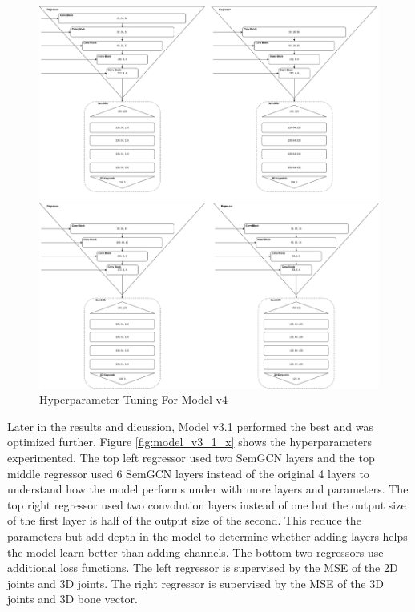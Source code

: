 \begin{figure}[ht]
	\begin{center}
		\includegraphics[width=450px]{assets/Model_v4.x.jpg}
		\caption{Hyperparameter Tuning For Model v4}
		\label{fig:model_v4_x}
	\end{center}
\end{figure}

\newpage

\noindent
Later in the results and dicussion, Model v3.1 performed the best and was optimized further. Figure \ref{fig:model_v3_1_x} shows the hyperparameters experimented. The top left regressor used two SemGCN layers and the top middle regressor used 6 SemGCN layers instead of the original 4 layers to understand how the model performs under with more layers and parameters. The top right regressor used two convolution layers instead of one but the output size of the first layer is half of the output size of the second. This reduce the parameters but add depth in the model to determine whether adding layers helps the model learn better than adding channels. The bottom two regressors use additional loss functions. The left regressor is supervised by the MSE of the 2D joints and 3D joints. The right regressor is supervised by the MSE of the 3D joints and 3D bone vector.

